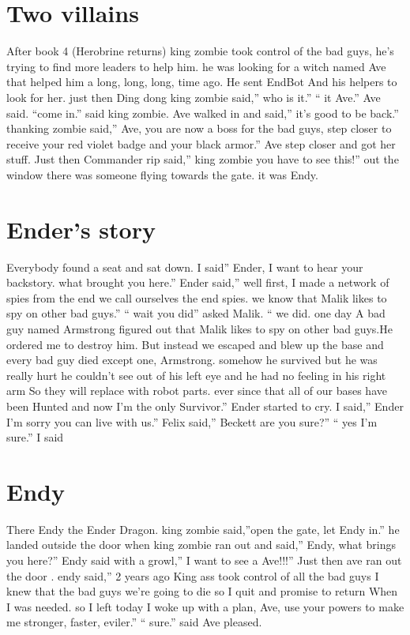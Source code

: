 \documentclass[12pt,oneside]{krantz}
\begin{document}
\hypertarget{two-villains}{%
\chapter{Two villains}\label{two-villains}}

After book 4 (Herobrine returns) king zombie took control of the bad
guys, he's trying to find more leaders to help him. he was looking for a
witch named Ave that helped him a long, long, long, time ago. He sent
EndBot And his helpers to look for her. just then Ding dong king zombie
said,'' who is it.'' `` it Ave.'' Ave said. ``come in.'' said king
zombie. Ave walked in and said,'' it's good to be back.'' thanking
zombie said,'' Ave, you are now a boss for the bad guys, step closer to
receive your red violet badge and your black armor.'' Ave step closer
and got her stuff. Just then Commander rip said,'' king zombie you have
to see this!'' out the window there was someone flying towards the gate.
it was Endy.

\hypertarget{enders-story}{%
\chapter{Ender's story}\label{enders-story}}

Everybody found a seat and sat down. I said'' Ender, I want to hear your
backstory. what brought you here.'' Ender said,'' well first, I made a
network of spies from the end we call ourselves the end spies. we know
that Malik likes to spy on other bad guys.'' `` wait you did'' asked
Malik. `` we did. one day A bad guy named Armstrong figured out that
Malik likes to spy on other bad guys.He ordered me to destroy him. But
instead we escaped and blew up the base and every bad guy died except
one, Armstrong. somehow he survived but he was really hurt he couldn't
see out of his left eye and he had no feeling in his right arm So they
will replace with robot parts. ever since that all of our bases have
been Hunted and now I'm the only Survivor.'' Ender started to cry. I
said,'' Ender I'm sorry you can live with us.'' Felix said,'' Beckett
are you sure?'' `` yes I'm sure.'' I said

\hypertarget{endy}{%
\chapter{Endy}\label{endy}}

There Endy the Ender Dragon. king zombie said,''open the gate, let Endy
in.'' he landed outside the door when king zombie ran out and said,''
Endy, what brings you here?'' Endy said with a growl,'' I want to see a
Ave!!!'' Just then ave ran out the door . endy said,'' 2 years ago King
ass took control of all the bad guys I knew that the bad guys we're
going to die so I quit and promise to return When I was needed. so I
left today I woke up with a plan, Ave, use your powers to make me
stronger, faster, eviler.'' `` sure.'' said Ave pleased.
\end{document}

